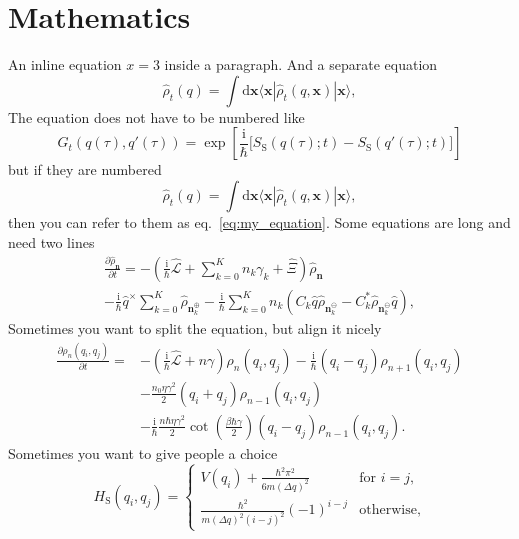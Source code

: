 \documentclass[11pt]{article}
\begin{document}
\section{Mathematics}
An inline equation $x=3$ inside a paragraph. And a separate equation
\begin{equation}
\hat{\rho}_t(q) = \int \mathrm{d}\bm{x}\langle\bm{x}|\hat{\rho}_t(q,\bm{x}) |\bm{x}\rangle,
\end{equation}
The equation does not have to be numbered like
\begin{equation*}
G_t(q(\tau),q'(\tau)) = \exp\left[\frac{\mathrm{i}}{\hbar}\bigl[S_\mathrm{S}(q(\tau);t)-S_\mathrm{S}(q'(\tau);t)\bigr]\right]
\end{equation*}
but if they are numbered
\begin{equation}
\hat{\rho}_t(q) = \int \mathrm{d}\bm{x}\langle\bm{x}|\hat{\rho}_t(q,\bm{x}) |\bm{x}\rangle,
\label{eq:my_equation}
\end{equation}
then you can refer to them as eq.~\ref{eq:my_equation}. Some equations are long and need two lines
\begin{multline}
\frac{\partial \hat{\rho}_{\bm{n}} }{\partial t} =
-\left(
\frac{\mathrm{i}}{\hbar}\hat{\mathcal{L}}
+\sum_{k=0}^{K}n_k \gamma_k
+\hat{\Xi}
\right)\hat{\rho}_{\bm{n}} \\
-\frac{\mathrm{i}}{\hbar}\hat{q}^\times \sum_{k=0}^{K}\hat{\rho}_{\bm{n}_k^\oplus}
-\frac{\mathrm{i}}{\hbar}\sum_{k=0}^{K}n_k\left(C_k\hat{q}\hat{\rho}_{\bm{n}_k^\ominus}-C_k^*\hat{\rho}_{\bm{n}_k^\ominus}\hat{q}\right),
\end{multline}
Sometimes you want to split the equation, but align it nicely
\begin{equation}
\begin{split}
\frac{\partial \rho_{n}(q_i,q_j) }{\partial t} =
&-\left(\frac{\mathrm{i}}{\hbar}\hat{\mathcal{L}}+n \gamma \right)\rho_{n}(q_i,q_j)
-\frac{\mathrm{i}}{\hbar}(q_i - q_j) \rho_{n+1}(q_i,q_j) \\
&-\frac{n_0 \eta\gamma^2}{2}(q_i + q_j) \rho_{n-1}(q_i,q_j) \\
&-\frac{\mathrm{i}}{\hbar}\frac{n \hbar \eta \gamma^2}{2}\cot\left(\frac{\beta\hbar\gamma}{2}\right)(q_i - q_j) \rho_{n-1}(q_i,q_j).
\end{split}
\end{equation}
Sometimes you want to give people a choice
\begin{equation}
H_\mathrm{S}(q_i,q_j) =
\begin{cases}
V(q_i) +\frac{\hbar^2\pi^2}{6 m (\Delta q)^2}& \text{for }i=j, \\
\frac{\hbar^2 }{m (\Delta q)^2 (i-j)^2}(-1)^{i-j} & \text{otherwise,}
\end{cases}
\label{eq:dvr_ham}
\end{equation}
\end{document}
